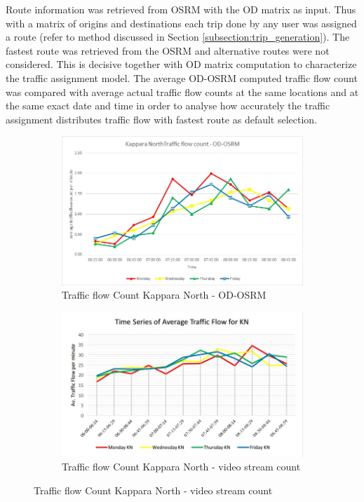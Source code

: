 \documentclass[12pt, a4paper]{report}
\theoremstyle{definition}
\theoremstyle{definition}%
\theoremstyle{definition}%
\theoremstyle{definition}%
\theoremstyle{definition}%
\theoremstyle{definition}%
\begin{document}
Route information was retrieved from OSRM with the OD matrix as input. Thus with a matrix of origins and destinations each trip done by any user was assigned a route (refer to method discussed in Section \ref{subsection:trip_generation}). The fastest route was retrieved from the OSRM and alternative routes were not considered. This is decisive together with OD matrix computation to characterize the traffic assignment model. The average OD-OSRM computed traffic flow count was compared with average actual traffic flow counts at the same locations and at the same exact date and time in order to analyse how accurately the traffic assignment distributes traffic flow with fastest route as default selection.


\begin{figure}[!] 
	\centering
	\begin{subfigure}{0.8\textwidth}
		\centering
		\includegraphics[width=\linewidth]{traffic_flow_count_KN_MINE.jpg} 
		\caption{\scriptsize{Traffic flow Count Kappara North - OD-OSRM}} 
		\label{fig:traffic_flow_count_KN_MINE}
	\end{subfigure}
	
	\vspace{1cm}
	\begin{subfigure}{0.8\textwidth}
		\centering
		\includegraphics[width=\linewidth]{traffic_flow_count_KN_Nigel_pace.jpg} 
		\caption{\scriptsize{Traffic flow Count Kappara North - video stream count}}
		\label{fig:traffic_flow_count_KN_NP}
	\end{subfigure}
	

\end{figure}
\end{document}
